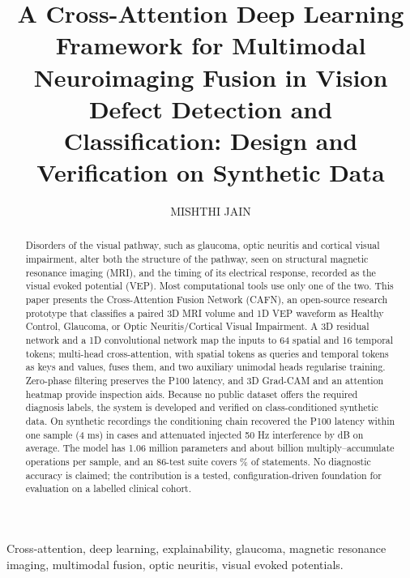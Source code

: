 \documentclass{ieeeaccessapprox}
\title{A Cross-Attention Deep Learning Framework for Multimodal Neuroimaging Fusion in Vision Defect Detection and Classification: Design and Verification on Synthetic Data}
\author{\uppercase{Mishthi Jain}\authorrefmark{1}}
\begin{document}
\maketitle

\begin{abstract}
Disorders of the visual pathway, such as glaucoma, optic neuritis and cortical visual impairment, alter both the structure of the pathway, seen on structural magnetic resonance imaging (MRI), and the timing of its electrical response, recorded as the visual evoked potential (VEP). Most computational tools use only one of the two. This paper presents the Cross-Attention Fusion Network (CAFN), an open-source research prototype that classifies a paired 3D MRI volume and 1D VEP waveform as Healthy Control, Glaucoma, or Optic Neuritis/Cortical Visual Impairment. A 3D residual network and a 1D convolutional network map the inputs to 64 spatial and 16 temporal tokens; multi-head cross-attention, with spatial tokens as queries and temporal tokens as keys and values, fuses them, and two auxiliary unimodal heads regularise training. Zero-phase filtering preserves the P100 latency, and 3D Grad-CAM and an attention heatmap provide inspection aids. Because no public dataset offers the required diagnosis labels, the system is developed and verified on class-conditioned synthetic data. On \nTrials{} synthetic recordings the conditioning chain recovered the P100 latency within one sample (4 ms) in \nWithin{} cases and attenuated injected 50 Hz interference by \nMainsDb{} dB on average. The model has 1.06 million parameters and about \nMACsG{} billion multiply--accumulate operations per sample, and an 86-test suite covers \covTotal\% of statements. No diagnostic accuracy is claimed; the contribution is a tested, configuration-driven foundation for evaluation on a labelled clinical cohort.
\end{abstract}

\begin{keywords}
Cross-attention, deep learning, explainability, glaucoma, magnetic resonance imaging, multimodal fusion, optic neuritis, visual evoked potentials.
\end{keywords}

\titlepgskip=-15pt
\end{document}
